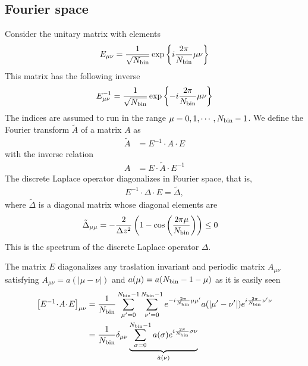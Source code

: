 \documentclass[b5paper,openright,10pt]{book}
\newcommand{\esc}{\!\cdot\!}
\begin{document}
\subsection{Fourier space}
\label{Sec:Fourier}
Consider the unitary matrix with elements
\begin{align}
E_{\mu\nu}=\frac{1}{\sqrt{N_{\rm bin}}}\exp\left\{i\frac{2\pi}{N_{\rm bin}}\mu\nu\right\}
\end{align} 
This matrix has the following inverse
\begin{align}
E^{-1}_{\mu\nu}=\frac{1}{\sqrt{N_{\rm bin}}}\exp\left\{-i\frac{2\pi}{N_{\rm bin}}\mu\nu\right\}
\end{align} 
The indices  are assumed  to run  in the  range $\mu=0,1,\cdots,N_{\rm
  bin}-1$.  
We define the Fourier transform $\tilde{A}$ of a matrix $A$ as
\begin{align}
    \tilde{A}&=E^{-1}\esc A\esc{E}
 \end{align}
with the inverse relation 
 \begin{align}
     A&=E\esc  \tilde{A}\esc{E}^{-1}
\label{FT}
\end{align}
The discrete Laplace operator diagonalizes in Fourier space, that is,
\begin{align}
  E^{-1}  \esc {\Delta} \esc E= \tilde{\Delta},
\label{EDE}
\end{align}
where $\tilde{\Delta}$ is a diagonal matrix whose diagonal  elements are
\begin{align}
\tilde{\Delta}_{\mu\mu}&=-\frac{2}{\Delta z^2}
\left(1-\cos\left( \frac{2\pi \mu}{N_{\rm bin}}\right)\right)\le0  
\label{Dmumu}
\end{align}
This is the  spectrum of the discrete Laplace  operator $\Delta$. 


The matrix $E$ diagonalizes any traslation invariant and periodic
matrix    $A_{\mu\nu}$    satisfying    $A_{\mu\nu}=a(|\mu-\nu|)$    and
$a(\mu)=a(N_{\rm bin}-1-\mu)$ as it is easily seen
\begin{align}
\left[  E^{-1}\esc A\esc E\right]_{\mu\nu}
&=
\frac{1}{N_{\rm bin}}\sum_{\mu'=0}^{N_{\rm bin}-1}\sum_{\nu'=0}^{N_{\rm bin}-1} e^{-i\frac{2\pi}{N_{\rm bin}}\mu\mu'}a(|\mu'-\nu'|)
e^{i\frac{2\pi}{N_{\rm bin}}\nu'\nu}
 \nonumber\\
&=\frac{1}{N_{\rm bin}}\delta_{\mu\nu}\underbrace{\sum_{\sigma=0}^{N_{\rm bin}-1}a(\sigma)e^{i\frac{2\pi}{N_{\rm bin}}\sigma\nu}}_{\tilde{a}(\nu)}
\end{align}
\end{document}
